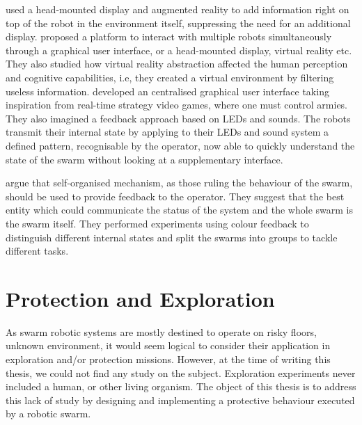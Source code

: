 \documentclass[a4paper, 12pt]{report}
\begin{document}
	\citet{daily2003world} used a head-mounted display and augmented reality to add information right on top of the robot in the environment itself, suppressing the need for an additional display. \citet{baizid2009human} proposed a platform to interact with multiple robots simultaneously through a graphical user interface, or a head-mounted display, virtual reality etc. They also studied how virtual reality abstraction affected the human perception and cognitive capabilities, i.e, they created a virtual environment by filtering useless information. \citet{mclurkin2006speaking} developed an centralised graphical user interface taking inspiration from real-time strategy video games, where one must control armies. They also imagined a feedback approach based on LEDs and sounds. The robots transmit their internal state by applying to their LEDs and sound system a defined pattern, recognisable by the operator, now able to quickly understand the state of the swarm without looking at a supplementary interface.
	
	\citet{podevijn2012self} argue that self-organised mechanism, as those ruling the behaviour of the swarm, should be used to provide feedback to the operator. They suggest that the best entity which could communicate the status of the system and the whole swarm is the swarm itself. They performed experiments using colour feedback to distinguish different internal states and split the swarms into groups to tackle different tasks.\\
	

	\section{Protection and Exploration}
	
	As swarm robotic systems are mostly destined to operate on risky floors, unknown environment, it would seem logical to consider their application in exploration and/or protection missions. However, at the time of writing this thesis, we could not find any study on the subject. Exploration experiments never included a human, or other living organism. The object of this thesis is to address this lack of study by designing and implementing a protective behaviour executed by a robotic swarm.
	
\end{document}
